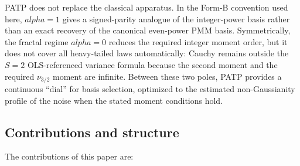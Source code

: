 \documentclass[11pt]{article}
\def\alpha{alpha}%
\theoremstyle{definition}
\begin{document}
PATP does not replace the classical apparatus. In the Form-B convention used
here, $\alpha = 1$ gives a signed-parity analogue of the integer-power basis
rather than an exact recovery of the canonical even-power PMM basis.
Symmetrically, the fractal regime $\alpha = 0$ reduces the required integer
moment order, but it does not cover all heavy-tailed laws automatically:
Cauchy remains outside the $S=2$ OLS-referenced variance formula because the
second moment and the required $\nu_{3/2}$ moment are infinite. Between
these two poles, PATP provides a continuous ``dial'' for basis selection,
optimized to the estimated non-Gaussianity profile of the noise when the
stated moment conditions hold.

\subsection{Contributions and structure}\label{sec:intro:contributions}

The contributions of this paper are:
\end{document}
